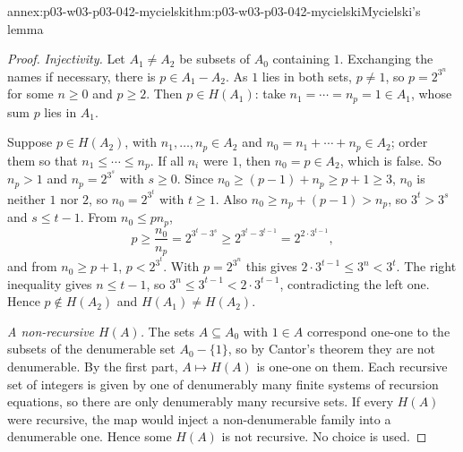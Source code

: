\begin{annexitem}{annex:p03-w03-p03-042-mycielski}{thm:p03-w03-p03-042-mycielski}{Mycielski's lemma}
\begin{proof}
\emph{Injectivity.}  Let \(A_1\neq A_2\) be subsets of \(A_0\) containing
\(1\).  Exchanging the names if necessary, there is \(p\in A_1-A_2\).
As \(1\) lies in both sets, \(p\neq1\), so \(p=2^{3^n}\) for some
\(n\geq0\) and \(p\geq2\).  Then \(p\in H(A_1)\): take \(n_1=\cdots=
n_p=1\in A_1\), whose sum \(p\) lies in \(A_1\).

Suppose \(p\in H(A_2)\), with \(n_1,\ldots,n_p\in A_2\) and
\(n_0=n_1+\cdots+n_p\in A_2\); order them so that \(n_1\leq\cdots\leq
n_p\).  If all \(n_i\) were \(1\), then \(n_0=p\in A_2\), which is false.
So \(n_p>1\) and \(n_p=2^{3^s}\) with \(s\geq0\).  Since \(n_0\geq
(p-1)+n_p\geq p+1\geq3\), \(n_0\) is neither \(1\) nor \(2\), so
\(n_0=2^{3^t}\) with \(t\geq1\).  Also \(n_0\geq n_p+(p-1)>n_p\), so
\(3^t>3^s\) and \(s\leq t-1\).  From \(n_0\leq pn_p\),
\[
 p\geq\frac{n_0}{n_p}=2^{3^t-3^s}\geq2^{3^t-3^{t-1}}=2^{2\cdot3^{t-1}},
\]
and from \(n_0\geq p+1\), \(p<2^{3^t}\).  With \(p=2^{3^n}\) this gives
\(2\cdot3^{t-1}\leq3^n<3^t\).  The right inequality gives \(n\leq t-1\),
so \(3^n\leq3^{t-1}<2\cdot3^{t-1}\), contradicting the left one.  Hence
\(p\notin H(A_2)\) and \(H(A_1)\neq H(A_2)\).

\emph{A non-recursive \(H(A)\).}  The sets \(A\subseteq A_0\) with
\(1\in A\) correspond one-one to the subsets of the denumerable set
\(A_0-\{1\}\), so by Cantor's theorem they are not denumerable.  By the
first part, \(A\mapsto H(A)\) is one-one on them.  Each recursive set of
integers is given by one of denumerably many finite systems of recursion
equations, so there are only denumerably many recursive sets.  If every
\(H(A)\) were recursive, the map would inject a non-denumerable family
into a denumerable one.  Hence some \(H(A)\) is not recursive.  No choice
is used.
\end{proof}
\end{annexitem}

